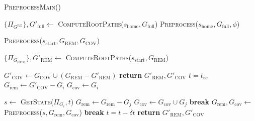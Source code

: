 \documentclass[letterpaper]{article} %
\begin{document}

\begin{algorithm}
\caption{\textsc{PreprocessMain()}}

\begin{algorithmic}[1]
\State $\{\Pi_{G^{\textrm{full}}}\}, G'_{\textrm{full}} \leftarrow$ \textsc{ComputeRootPaths}($s_{\textrm{home}},G_{\textrm{full}}$)
\State \textsc{Preprocess}($s_{\textrm{home}},G_{\textrm{full}},\phi$)
\end{algorithmic}
\end{algorithm}

\begin{algorithm}
\caption{\textsc{Preprocess}($s_{\textrm{start}},G_{\textrm{REM}},G_{\textrm{COV}}$)}\label{alg:1}
\begin{algorithmic}[1]
\State $\{\Pi_{G_{\textrm{REM}}}\}, G'_{\textrm{REM}} \leftarrow$ \textsc{ComputeRootPaths}($s_{\textrm{start}},G_{\textrm{REM}}$)

\State $G'_{\textrm{COV}} \leftarrow G_{\textrm{COV}} \cup (G_{\textrm{REM}} - G'_{\textrm{REM}})$
    \State \textbf{return} $G'_{\textrm{REM}},G'_{\textrm{COV}}$
\EndIf
{}
    \State $t = t_{rc}$
    \State $G_{\textrm{rem}} \leftarrow G'_{\textrm{COV}} - G_i$
    \State $G_{\textrm{cov}} \leftarrow G_i$

    
        \State $s \leftarrow$ \textsc{GetState($\Pi_{G_i}, t$)}
      {\color{blue}
                \State $G_{\textrm{rem}} \leftarrow G_{\textrm{rem}} - G_j$
                \State $G_{\textrm{cov}} \leftarrow G_{\textrm{cov}} \cup G_j$
            \EndIf}
        \EndFor
            \State \textbf{break}
        \EndIf
        \State $G_{\textrm{rem}},G_{\textrm{cov}} \leftarrow$ \textsc{Preprocess}($s,G_{\textrm{rem}},G_{\textrm{cov}}$)
            \State \textbf{break}
        \EndIf
        \State $t = t - \delta t$
    \EndWhile
\EndFor
\State \textbf{return} $G'_{\textrm{REM}},G'_{\textrm{COV}}$

\end{algorithmic}
\end{algorithm}
\end{document}
